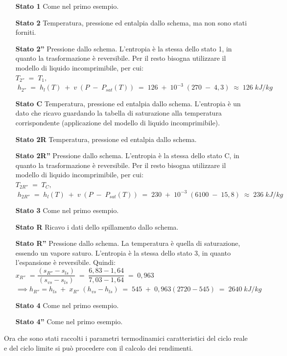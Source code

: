 \documentclass[a4paper, twoside, 12pt]{report}
\begin{document}
\begin{itemize}
	\item[\textbf{Stato 1  }] Come nel primo esempio.
	\item[\textbf{Stato 2  }] Temperatura, pressione ed entalpia dallo schema, ma non sono stati forniti.
	\item[\textbf{Stato 2''}] Pressione dallo schema. L'entropia è la stessa dello stato 1, in quanto la trasformazione è reversibile. Per il resto bisogna utilizzare il modello di liquido incomprimibile, per cui:\\
	$T_{2''}\;=\;T_{1},$\\
	$\;h_{2''}\;=\;h_{l}(T)\;+\;v\;(P\;-\;P_{sat}(T))\;=\;126\;+\;10^{-3}\;(270\;-\;4,3)\;\approx\;126\;kJ/kg$
	\item[\textbf{Stato C  }] Temperatura, pressione ed entalpia dallo schema. L'entropia è un dato che ricavo guardando la tabella di saturazione alla temperatura corrispondente (applicazione del modello di liquido incomprimibile).
	\item[\textbf{Stato 2R}] Temperatura, pressione ed entalpia dallo schema.
	\item[\textbf{Stato 2R''}] Pressione dallo schema. L'entropia è la stessa dello stato C, in quanto la trasformazione è reversibile. Per il resto bisogna utilizzare il modello di liquido incomprimibile, per cui:\\
	$T_{2R''}\;=\;T_{C},$\\
	$\;h_{2R''}\;=\;h_{l}(T)\;+\;v\;(P\;-\;P_{sat}(T))\;=\;230\;+\;10^{-3}\;(6100\;-\;15,8)\;\approx\;236\;kJ/kg$
	\item[\textbf{Stato 3  }] Come nel primo esempio.
	\item[\textbf{Stato R  }] Ricavo i dati dello spillamento dallo schema.
	\item[\textbf{Stato R''}] Pressione dallo schema. La temperatura è quella di saturazione, essendo un vapore saturo. L'entropia è la stessa dello stato 3, in quanto l'espansione è reversibile. Quindi:\\
	$x_{R''}\;=\dfrac{(s_{R''}-s_{ls})}{(s_{vs}-s_{ls})}\;=\;\dfrac{6,83-1,64}{7,03-1,64}\;=\;0,963$\\
	$\implies h_{R''}=h_{ls}\;+\;x_{R''}\;(h_{vs}-h_{ls})\;=\;545\;+\;0,963(2720-545)\;=\;2640\;kJ/kg$
	\item[\textbf{Stato 4  }] Come nel primo esempio.
	\item[\textbf{Stato 4''}] Come nel primo esempio.
\end{itemize}
Ora che sono stati raccolti i parametri termodinamici caratteristici del ciclo reale e del ciclo limite si può procedere con il calcolo dei rendimenti.
\end{document}
